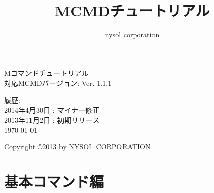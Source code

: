 \documentclass[a4paper]{jsbook}
\title{MCMDチュートリアル}
\author{nysol corporation}
\date{}
\begin{document}
\begin{titlepage}
\begin{center}
{\huge Mコマンドチュートリアル}\\
\vspace{10truept}
{\normalsize 対応MCMDバージョン: Ver. 1.1.1}\\
\vspace{1cm}

履歴:\\
2014年4月30日 : マイナー修正\\
2013年11月2日 : 初期リリース\\
\vspace{18cm}
{\small \today}

{\small Copyright \copyright 2013 by NYSOL CORPORATION}

\end{center}
\end{titlepage}

\setcounter{tocdepth}{1}
\tableofcontents

\chapter{基本コマンド編}
















\printindex
\end{document}
